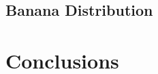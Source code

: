 \documentclass[english,twoside,openright]{HYgraduMLDS}
\begin{document}

\section{Banana Distribution}

\chapter{Conclusions}

\cleardoublepage %



%
%
\end{document}
